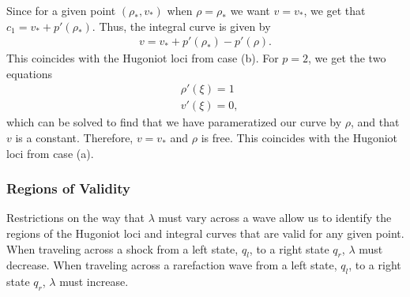 \documentclass{article}
\begin{document}
Since for a given point $(\rho_*, v_*)$ when $\rho = \rho_*$ we want 
$v = v_*$, we get that $c_1 = v_* + p'(\rho_*)$. Thus, the integral curve 
is given by 
\begin{align*}
v = v_* + p'(\rho_*) - p'(\rho ).
\end{align*}
This coincides with the Hugoniot loci from case (b). For $p = 2$, we get the 
two equations
\begin{align*}
&\rho'(\xi ) = 1 \\
&v'(\xi ) = 0,
\end{align*}
which can be solved to find that we have parameratized our curve by $\rho$, 
and that $v$ is a constant. Therefore, $v = v_*$ and $\rho$ is free. 
This coincides with the Hugoniot loci from case (a).

\subsubsection{Regions of Validity}
Restrictions on the way that $\lambda$ must vary across a wave allow us to identify the regions of the Hugoniot loci and integral curves that are valid for any given point. When traveling across a shock from a left state, $q_l$, to a right state $q_r$, $\lambda$ must decrease. When traveling across a rarefaction wave from a left state, $q_l$, to a right state $q_r$, $\lambda$ must increase. 
\end{document}
